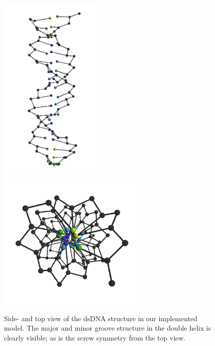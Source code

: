 \begin{figure}[h]
\begin{center}
\includegraphics[width=5cm]{images/methods_dnaStructure1} \includegraphics[width=7cm]{images/methods_dnaStructure2}

\end{center}\label{methods_dnaStructure}
\caption{Side- and top view of the dsDNA structure in our implemented model. The major and minor groove structure in the double helix is clearly visible; as is the screw symmetry from the top view.}
\end{figure}



